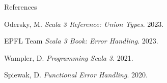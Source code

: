 \documentclass{beamer}
\begin{document}
\begin{frame}{References}
\footnotesize

\begin{thebibliography}{4}
\beamertemplatetextbibitems

\textcolor{pureblue}{Odersky, M.} 
\textit{Scala 3 Reference: Union Types}. 2023.

\textcolor{pureblue}{EPFL Team} 
\textit{Scala 3 Book: Error Handling}. 2023.

\textcolor{pureblue}{Wampler, D.} 
\textit{Programming Scala 3}. 2021.

\textcolor{pureblue}{Spiewak, D.} 
\textit{Functional Error Handling}. 2020.

\end{thebibliography}

\end{frame}
\end{document}

